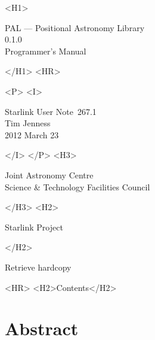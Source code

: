 \documentclass[twoside,11pt]{article}
\newcommand{\stardoccategory}  {Starlink User Note}
\newcommand{\stardocsource}    {sun\stardocnumber}
\newcommand{\stardocnumber}    {267.1}
\newcommand{\stardocauthors}   {Tim Jenness}
\newcommand{\stardocdate}      {2012 March 23}
\newcommand{\stardoctitle}     {PAL --- Positional Astronomy Library}
\newcommand{\stardocversion}   {0.1.0}
\newcommand{\stardocmanual}    {Programmer's Manual}
\newcommand{\htmladdnormallink}[2]{#1}
\newcommand{\htmladdimg}[1]{}
\newcommand{\htmlref}[2]{#1}
\newcommand{\htmladdtonavigation}[1]{}
\newcommand{\xlabel}[1]{}
\renewcommand{\_}{\texttt{\symbol{95}}}
\begin{document}
\begin{htmlonly}
   \xlabel{}
   \begin{rawhtml} <H1> \end{rawhtml}
      \stardoctitle\\
      \stardocversion\\
      \stardocmanual
   \begin{rawhtml} </H1> <HR> \end{rawhtml}


   \begin{rawhtml} <P> <I> \end{rawhtml}
   \stardoccategory\ \stardocnumber \\
   \stardocauthors \\
   \stardocdate
   \begin{rawhtml} </I> </P> <H3> \end{rawhtml}
      \htmladdnormallink{Joint Astronomy Centre}
                        {http://www.jach.hawaii.edu} \\
      \htmladdnormallink{Science \& Technology Facilities Council}
                        {http://www.scitech.ac.uk} \\
   \begin{rawhtml} </H3> <H2> \end{rawhtml}
      \htmladdnormallink{Starlink Project}{http://www.starlink.ac.uk/}
   \begin{rawhtml} </H2> \end{rawhtml}
   \htmladdnormallink{\htmladdimg{source.gif} Retrieve hardcopy}
      {http://www.starlink.ac.uk/cgi-bin/hcserver?\stardocsource}\\

  \label{stardoccontents}
  \begin{rawhtml}
    <HR>
    <H2>Contents</H2>
  \end{rawhtml}
  \htmladdtonavigation{\htmlref{\htmladdimg{contents_motif.gif}}
        {stardoccontents}}

  \section{\xlabel{abstract}Abstract}
\end{htmlonly}
\end{document}
